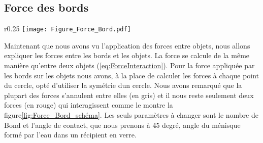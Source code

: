         \subsection{Force des bords}
            \begin{wrapfigure}{r}{0.25\textwidth}
            \centering
                \texttt{[image: Figure\_Force\_Bord.pdf]}
                \caption{Schéma des forces des bords.}
                \label{fig:Force_Bord_schéma}
            \end{wrapfigure}
            Maintenant que nous avons vu l'application des forces entre objets, nous allons expliquer les forces entre les bords et les objets. La force se calcule de la même manière qu'entre deux objets (\ref{eq:ForceInteraction}). Pour la force appliquée par les bords sur les objets nous avons, à la place de calculer les forces à chaque point du cercle, opté d'utiliser la symétrie dun cercle. Nous avons remarqué que la plupart des forces s'annulent entre elles (en gris) et il nous reste seulement deux forces (en rouge) qui interagissent comme le montre la figure\ref{fig:Force_Bord_schéma}. Les seuls paramètres à changer sont le nombre de Bond et l'angle de contact, que nous prenons à 45 degré, angle du ménisque formé par l'eau dans un récipient en verre. 
